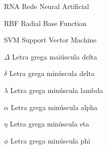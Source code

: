 \documentclass{abntex2}[
	12pt,				%
	openright,			%
	twoside,			%
	a4paper,			%
	chapter=TITLE,		%
	section=TITLE,		%
	subsection=TITLE,	%
	subsubsection=TITLE,%
	english,			%
	brazil				%
]
\begin{document}




\listoffigures*
\cleardoublepage

\listoftables*
\cleardoublepage

\begin{siglas}
    \item[RNA] Rede Neural Artificial
    \item[RBF] Radial Base Function
    \item[SVM] Support Vector Machine
\end{siglas}

\begin{simbolos}
  \item[$ \Delta $] Letra grega maiúscula delta
  \item[$ \delta $] Letra grega minúscula delta
  \item[$ \lambda $] Letra grega minúscula lambda
  \item[$ \alpha $] Letra grega minúscula alpha
  \item[$ \eta $] Letra grega minúscula eta
  \item[$ \phi $] Letra grega minúscula phi
\end{simbolos}
\end{document}

